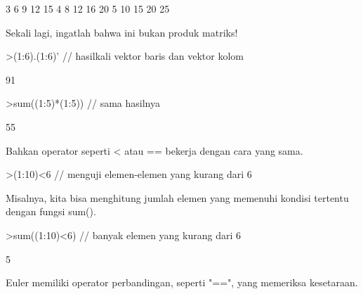 \documentclass[a4paper,10pt]{article}
\begin{document}
\begin{eulernotebook}
\begin{eulercomment}
\begin{eulercomment}
\begin{eulercomment}
\begin{eulercomment}
\begin{eulercomment}
\begin{eulercomment}
\begin{eulercomment}
\begin{eulercomment}
\begin{eulercomment}
\begin{eulercomment}
\begin{eulercomment}
\begin{eulercomment}
\begin{eulercomment}
\begin{eulercomment}
\begin{eulercomment}
\begin{eulercomment}
\begin{euleroutput}
              3             6             9            12            15 
              4             8            12            16            20 
              5            10            15            20            25 
\end{euleroutput}
\begin{eulercomment}
Sekali lagi, ingatlah bahwa ini bukan produk matriks!
\end{eulercomment}
\begin{eulerprompt}
>(1:6).(1:6)' // hasilkali vektor baris dan vektor kolom
\end{eulerprompt}
\begin{euleroutput}
  91
\end{euleroutput}
\begin{eulerprompt}
>sum((1:5)*(1:5)) // sama hasilnya
\end{eulerprompt}
\begin{euleroutput}
  55
\end{euleroutput}
\begin{eulercomment}
Bahkan operator seperti \textless{} atau == bekerja dengan cara yang sama.
\end{eulercomment}
\begin{eulerprompt}
>(1:10)<6 // menguji elemen-elemen yang kurang dari 6
\end{eulerprompt}
\begin{euleroutput}
  [1,  1,  1,  1,  1,  0,  0,  0,  0,  0]
\end{euleroutput}
\begin{eulercomment}
Misalnya, kita bisa menghitung jumlah elemen yang memenuhi kondisi
tertentu dengan fungsi sum().
\end{eulercomment}
\begin{eulerprompt}
>sum((1:10)<6) // banyak elemen yang kurang dari 6
\end{eulerprompt}
\begin{euleroutput}
  5
\end{euleroutput}
\begin{eulercomment}
Euler memiliki operator perbandingan, seperti "==", yang memeriksa
kesetaraan.


\end{eulercomment}
\end{eulercomment}
\end{eulercomment}
\end{eulercomment}
\end{eulercomment}
\end{eulercomment}
\end{eulercomment}
\end{eulercomment}
\end{eulercomment}
\end{eulercomment}
\end{eulercomment}
\end{eulercomment}
\end{eulercomment}
\end{eulercomment}
\end{eulercomment}
\end{eulercomment}
\end{eulercomment}
\end{eulernotebook}
\end{document}
